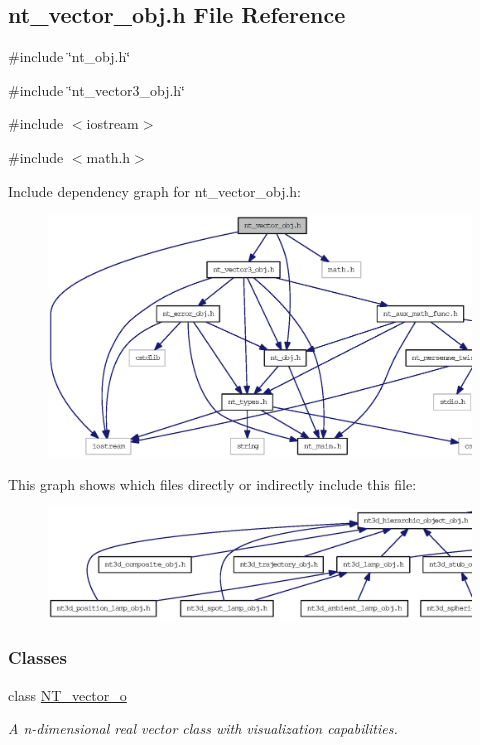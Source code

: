 \subsection{nt\_\-vector\_\-obj.h File Reference}
\label{nt__vector__obj_8h}
{\ttfamily \#include \char`\"{}nt\_\-obj.h\char`\"{}}\par
{\ttfamily \#include \char`\"{}nt\_\-vector3\_\-obj.h\char`\"{}}\par
{\ttfamily \#include $<$iostream$>$}\par
{\ttfamily \#include $<$math.h$>$}\par
Include dependency graph for nt\_\-vector\_\-obj.h:
\nopagebreak
\begin{figure}[H]
\begin{center}
\leavevmode
\includegraphics[width=400pt]{nt__vector__obj_8h__incl}
\end{center}
\end{figure}
This graph shows which files directly or indirectly include this file:
\nopagebreak
\begin{figure}[H]
\begin{center}
\leavevmode
\includegraphics[width=400pt]{nt__vector__obj_8h__dep__incl}
\end{center}
\end{figure}
\subsubsection*{Classes}
\begin{DoxyCompactItemize}
\item 
class \hyperlink{class_n_t__vector__o}{NT\_\-vector\_\-o}
\begin{DoxyCompactList}\small\item\em A n-\/dimensional real vector class with visualization capabilities. \item\end{DoxyCompactList}\end{DoxyCompactItemize}
